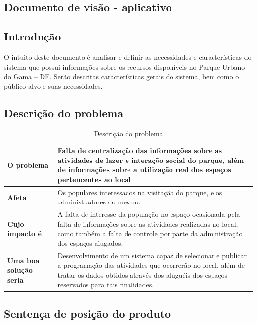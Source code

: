 \begin{anexosenv}

\partanexos

\chapter{Documento de visão - aplicativo}

\section{Introdução}

	O intuito deste documento é analisar e definir as necessidades e características do sistema que possui informações sobre os recursos disponíveis no Parque Urbano do Gama – DF. Serão descritas características gerais do sistema, bem como o público alvo e suas necessidades.
	
\section {Descrição do problema}

\begin{table}[h]
\centering
\caption{Descrição do problema}
\label{DescricaoDoProblema}
\begin{tabular}{|p{4cm}|p{8cm}|}  \hline
\textbf{O problema} &Falta de centralização das informações sobre as 
atividades de lazer e interação social do parque, além de informações 
sobre a utilização real dos espaços pertencentes ao local \\ \hline
\textbf{Afeta} &Os populares interessados na visitação do parque, 
e os administradores do mesmo. \\ \hline
\textbf{Cujo impacto é} &A falta de interesse da população no espaço 
ocasionada pela falta de informações sobre as atividades realizadas no local, 
como também a falta de controle 
por parte da administração dos espaços alugados. \\ \hline
\textbf{Uma boa solução seria} &Desenvolvimento de um sistema 
capaz de selecionar e publicar a programação das atividades 
que ocorrerão no local, além de tratar os dados obtidos 
através dos aluguéis dos espaços reservados para tais finalidades. \\ \hline
\end{tabular}
\end{table}

\section {Sentença de posição do produto}


\end{anexosenv}
